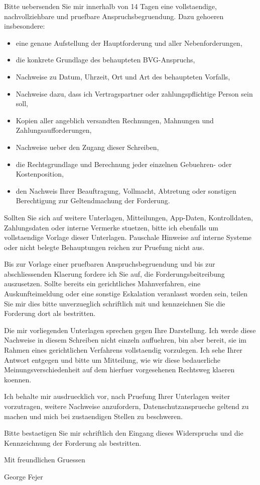 \documentclass[11pt,a4paper]{article}
\begin{document}
Bitte uebersenden Sie mir innerhalb von 14 Tagen eine vollstaendige, nachvollziehbare und pruefbare Anspruchsbegruendung. Dazu gehoeren insbesondere:
\begin{itemize}
  \item eine genaue Aufstellung der Hauptforderung und aller Nebenforderungen,
  \item die konkrete Grundlage des behaupteten BVG-Anspruchs,
  \item Nachweise zu Datum, Uhrzeit, Ort und Art des behaupteten Vorfalls,
  \item Nachweise dazu, dass ich Vertragspartner oder zahlungspflichtige Person sein soll,
  \item Kopien aller angeblich versandten Rechnungen, Mahnungen und Zahlungsaufforderungen,
  \item Nachweise ueber den Zugang dieser Schreiben,
  \item die Rechtsgrundlage und Berechnung jeder einzelnen Gebuehren- oder Kostenposition,
  \item den Nachweis Ihrer Beauftragung, Vollmacht, Abtretung oder sonstigen Berechtigung zur Geltendmachung der Forderung.
\end{itemize}

Sollten Sie sich auf weitere Unterlagen, Mitteilungen, App-Daten, Kontrolldaten, Zahlungsdaten oder interne Vermerke stuetzen, bitte ich ebenfalls um vollstaendige Vorlage dieser Unterlagen. Pauschale Hinweise auf interne Systeme oder nicht belegte Behauptungen reichen zur Pruefung nicht aus.

Bis zur Vorlage einer pruefbaren Anspruchsbegruendung und bis zur abschliessenden Klaerung fordere ich Sie auf, die Forderungsbeitreibung auszusetzen. Sollte bereits ein gerichtliches Mahnverfahren, eine Auskunfteimeldung oder eine sonstige Eskalation veranlasst worden sein, teilen Sie mir dies bitte unverzueglich schriftlich mit und kennzeichnen Sie die Forderung dort als bestritten.

Die mir vorliegenden Unterlagen sprechen gegen Ihre Darstellung. Ich werde diese Nachweise in diesem Schreiben nicht einzeln auffuehren, bin aber bereit, sie im Rahmen eines gerichtlichen Verfahrens vollstaendig vorzulegen. Ich sehe Ihrer Antwort entgegen und bitte um Mitteilung, wie wir diese bedauerliche Meinungsverschiedenheit auf dem hierfuer vorgesehenen Rechtsweg klaeren koennen.

Ich behalte mir ausdruecklich vor, nach Pruefung Ihrer Unterlagen weiter vorzutragen, weitere Nachweise anzufordern, Datenschutzansprueche geltend zu machen und mich bei zustaendigen Stellen zu beschweren.

Bitte bestaetigen Sie mir schriftlich den Eingang dieses Widerspruchs und die Kennzeichnung der Forderung als bestritten.

\vspace{2.0em}

Mit freundlichen Gruessen

\vspace{2.5em}

George Fejer
\end{document}
